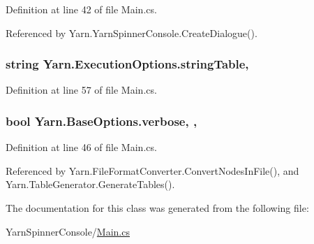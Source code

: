 Definition at line 42 of file Main.\-cs.



Referenced by Yarn.\-Yarn\-Spinner\-Console.\-Create\-Dialogue().

\hypertarget{a00103_a7e43c3b73722956cb0f5d507e4eef527}{
\subsubsection[{string\-Table}]{\setlength{\rightskip}{0pt plus 5cm}string Yarn.\-Execution\-Options.\-string\-Table\hspace{0.3cm}{\ttfamily [get]}, {\ttfamily [set]}}}\label{a00103_a7e43c3b73722956cb0f5d507e4eef527}


Definition at line 57 of file Main.\-cs.

\hypertarget{a00041_ada4d83d1756918f362d55f6649b82b17}{
\subsubsection[{verbose}]{\setlength{\rightskip}{0pt plus 5cm}bool Yarn.\-Base\-Options.\-verbose\hspace{0.3cm}{\ttfamily [get]}, {\ttfamily [set]}, {\ttfamily [inherited]}}}\label{a00041_ada4d83d1756918f362d55f6649b82b17}


Definition at line 46 of file Main.\-cs.



Referenced by Yarn.\-File\-Format\-Converter.\-Convert\-Nodes\-In\-File(), and Yarn.\-Table\-Generator.\-Generate\-Tables().



The documentation for this class was generated from the following file\-:\begin{DoxyCompactItemize}
\item 
Yarn\-Spinner\-Console/\hyperlink{a00325}{Main.\-cs}\end{DoxyCompactItemize}
